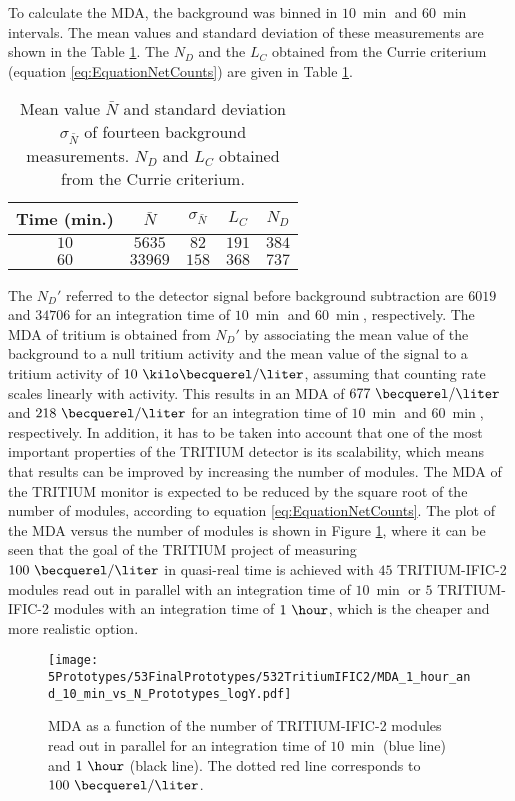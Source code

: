 To calculate the MDA, the background was binned in $10~\min$ and $60~\min$ intervals. The mean values and standard deviation of these measurements are shown in the Table \ref{tab:CurrieLawTRITIUMIFIC2}. The $N_D$ and the $L_C$ obtained from the Currie criterium (equation \ref{eq:EquationNetCounts}) are given in Table \ref{tab:CurrieLawTRITIUMIFIC2}.
\begin{table}[htbp]
\centering{}%
\begin{tabular}{ccccc}
\toprule 
Time (min.) & $\bar{N}$ & $\sigma_{\bar{N}}$ & $L_C$ & $N_D$ \tabularnewline
\midrule
\midrule 
$10$ & $5635$ & $82$ & $191$ & $384$ \tabularnewline
$60$ & $33969$ & $158$ & $368$ & $737$ \tabularnewline
\bottomrule
\end{tabular}
\caption{Mean value $\bar{N}$ and standard deviation $\sigma_{\bar{N}}$ of fourteen background measurements. $N_D$ and $L_C$ obtained from the Currie criterium.}
\label{tab:CurrieLawTRITIUMIFIC2}
\end{table}
The $N_D'$ referred to the detector signal before background subtraction are $6019$ and $34706$ for an integration time of $10~\min$ and $60~\min$, respectively. The MDA of tritium is obtained from $N_D'$ by associating the mean value of the background to a null tritium activity and the mean value of the signal to a tritium activity of $10~\kilo\becquerel/\liter$, assuming that counting rate scales linearly with activity. This results in an MDA of $677~\becquerel/\liter$ and $218~\becquerel/\liter$ for an integration time of $10~\min$ and $60~\min$, respectively. In addition, it has to be taken into account that one of the most important properties of the TRITIUM detector is its scalability, which means that results can be improved by increasing the number of modules. The MDA of the TRITIUM monitor is expected to be reduced by the square root of the number of modules, according to equation \ref{eq:EquationNetCounts}. The plot of the MDA versus the number of modules is shown in Figure \ref{fig:MDATRITIUMmonitor}, where it can be seen that the goal of the TRITIUM project of measuring $100~\becquerel/\liter$ in quasi-real time is achieved with $45$ TRITIUM-IFIC-2 modules read out in parallel with an integration time of $10~\min$ or $5$ TRITIUM-IFIC-2 modules with an integration time of $1~\hour$, which is the cheaper and more realistic option. %

\begin{figure}[h]
\centering
\texttt{[image: 5Prototypes/53FinalPrototypes/532TritiumIFIC2/MDA\_1\_hour\_and\_10\_min\_vs\_N\_Prototypes\_logY.pdf]}
\caption{MDA as a function of the number of TRITIUM-IFIC-2 modules read out in parallel for an integration time of $10~\min$ (blue line) and $1~\hour$ (black line). The dotted red line corresponds to $100~\becquerel/\liter$. \label{fig:MDATRITIUMmonitor}}
\end{figure}


